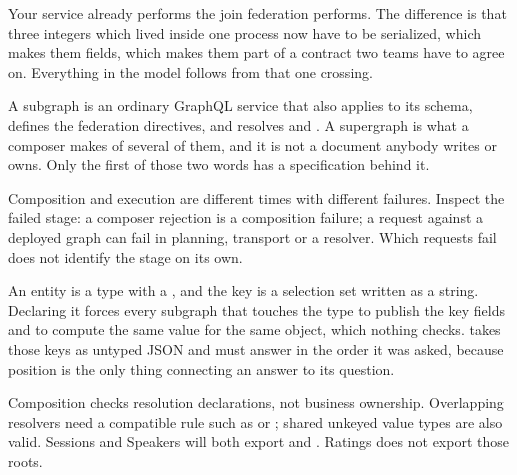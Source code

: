 \begin{chaptersummary}
  \item Your service already performs the join federation performs. The
        difference is that three integers which lived inside one process now
        have to be serialized, which makes them fields, which makes them part
        of a contract two teams have to agree on. Everything in the model
        follows from that one crossing.
  \item A subgraph is an ordinary GraphQL service that also applies
         to its schema, defines the federation directives, and
        resolves  and . A supergraph is what a
        composer makes of several of them, and it is not a document anybody
        writes or owns. Only the first of those two words has a specification
        behind it.
  \item Composition and execution are different times with different failures.
        Inspect the failed stage: a composer rejection is a composition
        failure; a request against a deployed graph can fail in planning,
        transport or a resolver. Which requests fail does not identify the
        stage on its own.
  \item An entity is a type with a , and the key is a selection set
        written as a string. Declaring it forces every subgraph that touches
        the type to publish the key fields and to compute the same value for
        the same object, which nothing checks.  takes those
        keys as untyped JSON and must answer in the order it was asked, because
        position is the only thing connecting an answer to its question.
  \item Composition checks resolution declarations, not business ownership.
        Overlapping resolvers need a compatible rule such as
         or ; shared unkeyed value types are
        also valid. Sessions and Speakers will both export 
        and . Ratings does not export those roots.
\end{chaptersummary}
